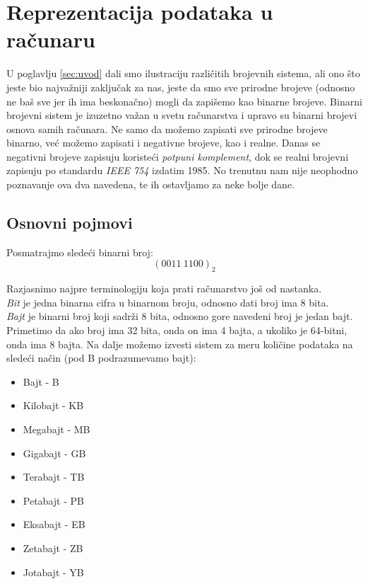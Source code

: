 \documentclass[a4paper]{article}
\begin{document}
\section{Reprezentacija podataka u računaru}
\label{sec:data}
U poglavlju \ref{sec:uvod} dali smo ilustraciju različitih brojevnih sistema, ali ono što jeste bio najvažniji zaključak za nas, jeste da smo sve prirodne brojeve (odnosno ne baš sve jer ih ima beskonačno) 
mogli da zapišemo kao binarne brojeve. Binarni brojevni sistem je izuzetno važan u svetu računarstva i upravo su binarni brojevi osnova samih računara. 
Ne samo da možemo zapisati sve prirodne brojeve binarno, već možemo zapisati i negativne brojeve, kao i realne. Danas se negativni brojeve zapisuju koristeći \emph{potpuni komplement}, dok se realni
brojevni zapisuju po standardu \emph{IEEE 754} izdatim 1985. No trenutnu nam nije neophodno poznavanje ova dva navedena, te ih ostavljamo za neke bolje dane.

\subsection{Osnovni pojmovi}
Posmatrajmo sledeći binarni broj:
$$ (0011 \ 1100)_2 $$

Razjasnimo najpre terminologiju koja prati računarstvo još od nastanka. \\
\emph{Bit} je jedna binarna cifra u binarnom broju, odnosno dati broj ima 8 bita. \\
\emph{Bajt} je binarni broj koji sadrži 8 bita, odnosno gore navedeni broj je jedan bajt. \\

Primetimo da ako broj ima 32 bita, onda on ima 4 bajta, a ukoliko je 64-bitni, onda ima 8 bajta. Na dalje možemo izvesti sistem
za meru količine podataka na sledeći način (pod B podrazumevamo bajt):

\begin{itemize}
 \item Bajt - B
 \item Kilobajt - KB
 \item Megabajt - MB
 \item Gigabajt - GB
 \item Terabajt - TB
 \item Petabajt - PB
 \item Eksabajt - EB
 \item Zetabajt - ZB
 \item Jotabajt - YB
\end{itemize}
\end{document}
